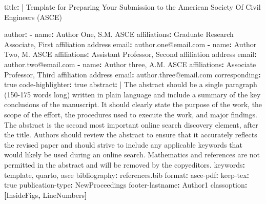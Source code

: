 \documentclass[Journal,LineNumbers]{ascelike-new}
\newenvironment{Shaded}{\begin{snugshade}}{\end{snugshade}}
\newcommand{\AttributeTok}[1]{\textcolor[rgb]{0.40,0.45,0.13}{#1}}
\newcommand{\CharTok}[1]{\textcolor[rgb]{0.13,0.47,0.30}{#1}}
\newcommand{\FunctionTok}[1]{\textcolor[rgb]{0.28,0.35,0.67}{#1}}
\newcommand{\KeywordTok}[1]{\textcolor[rgb]{0.00,0.23,0.31}{\textbf{#1}}}
\newcommand{\NormalTok}[1]{\textcolor[rgb]{0.00,0.23,0.31}{#1}}
\begin{document}
\begin{Shaded}
\begin{Highlighting}[]
\FunctionTok{title}\KeywordTok{: }\CharTok{|}\AttributeTok{ }
\NormalTok{  Template for Preparing Your Submission to the }
\NormalTok{  American Society Of Civil Engineers (ASCE) }

\FunctionTok{author}\KeywordTok{:}
\AttributeTok{  }\KeywordTok{{-}}\AttributeTok{ }\FunctionTok{name}\KeywordTok{:}\AttributeTok{ Author One, S.M. ASCE}
\AttributeTok{    }\FunctionTok{affiliations}\KeywordTok{:}\AttributeTok{ Graduate Research Associate, First affiliation address}
\AttributeTok{    }\FunctionTok{email}\KeywordTok{:}\AttributeTok{ author.one@email.com}
\AttributeTok{  }\KeywordTok{{-}}\AttributeTok{ }\FunctionTok{name}\KeywordTok{:}\AttributeTok{ Author Two, M. ASCE}
\AttributeTok{    }\FunctionTok{affiliations}\KeywordTok{:}\AttributeTok{ Assistant Professor, Second affiliation address}
\AttributeTok{    }\FunctionTok{email}\KeywordTok{:}\AttributeTok{ author.two@email.com}
\AttributeTok{  }\KeywordTok{{-}}\AttributeTok{ }\FunctionTok{name}\KeywordTok{:}\AttributeTok{ Author three, A.M. ASCE}
\AttributeTok{    }\FunctionTok{affiliations}\KeywordTok{:}\AttributeTok{ Associate Professor, Third affiliation address}
\AttributeTok{    }\FunctionTok{email}\KeywordTok{:}\AttributeTok{ author.three@email.com}
\AttributeTok{    }\FunctionTok{corresponding}\KeywordTok{:}\AttributeTok{ }\CharTok{true}
\FunctionTok{code{-}highlighter}\KeywordTok{:}\AttributeTok{ }\CharTok{true}
\FunctionTok{abstract}\KeywordTok{: }\CharTok{|}
\NormalTok{  The abstract should be a single paragraph (150{-}175 words long) written}
\NormalTok{  in plain language and include a summary of the key conclusions of the}
\NormalTok{  manuscript. It should clearly state the purpose of the work, the scope}
\NormalTok{  of the effort, the procedures used to execute the work, and major}
\NormalTok{  findings. The abstract is the second most important online search}
\NormalTok{  discovery element, after the title. Authors should review the abstract}
\NormalTok{  to ensure that it accurately reflects the revised paper and should}
\NormalTok{  strive to include any applicable keywords that would likely be used}
\NormalTok{  during an online search. Mathematics and references are not permitted}
\NormalTok{  in the abstract and will be removed by the copyeditors.}
\FunctionTok{keywords}\KeywordTok{:}\AttributeTok{ template, quarto, asce}
\FunctionTok{bibliography}\KeywordTok{:}\AttributeTok{ references.bib}
\FunctionTok{format}\KeywordTok{:}\AttributeTok{ }
\AttributeTok{  }\FunctionTok{asce{-}pdf}\KeywordTok{:}
\AttributeTok{    }\FunctionTok{keep{-}tex}\KeywordTok{:}\AttributeTok{ }\CharTok{true}
\AttributeTok{    }\FunctionTok{publication{-}type}\KeywordTok{:}\AttributeTok{ NewProceedings}
\AttributeTok{    }\FunctionTok{footer{-}lastname}\KeywordTok{:}\AttributeTok{ Author1}
\AttributeTok{    }\FunctionTok{classoption}\KeywordTok{:}\AttributeTok{ }\KeywordTok{[}\AttributeTok{InsideFigs}\KeywordTok{,}\AttributeTok{ LineNumbers}\KeywordTok{]}
\end{Highlighting}
\end{Shaded}
\end{document}
